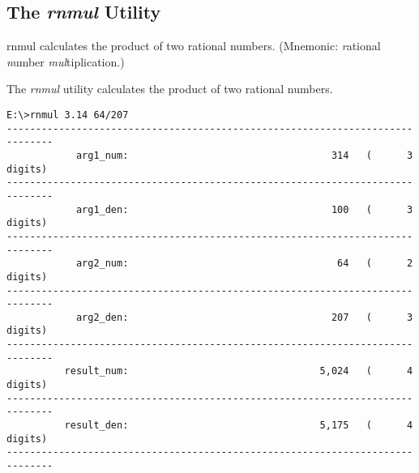 \subsection{The \emph{rnmul} Utility}
\label{cdcm0:srnu0:srmu0}

\begin{dosutilcommandname}{rnmul}%
calculates the product of two rational numbers.
(Mnemonic:  \emph{r}ational
\emph{n}umber \emph{mul}tiplication.)
\end{dosutilcommandname}

\begin{dosutilcommandsynopsis}
\end{dosutilcommandsynopsis}

\begin{dosutilcommanddescription}
The \emph{rnmul} utility calculates the product
of two rational numbers.
\end{dosutilcommanddescription}

\begin{dosutilcommandsampleinvocations}
\begin{scriptsize}
\begin{verbatim}
E:\>rnmul 3.14 64/207
------------------------------------------------------------------------------
            arg1_num:                                   314   (      3 digits)
------------------------------------------------------------------------------
            arg1_den:                                   100   (      3 digits)
------------------------------------------------------------------------------
            arg2_num:                                    64   (      2 digits)
------------------------------------------------------------------------------
            arg2_den:                                   207   (      3 digits)
------------------------------------------------------------------------------
          result_num:                                 5,024   (      4 digits)
------------------------------------------------------------------------------
          result_den:                                 5,175   (      4 digits)
------------------------------------------------------------------------------
\end{verbatim}
\end{scriptsize}
\end{dosutilcommandsampleinvocations}

